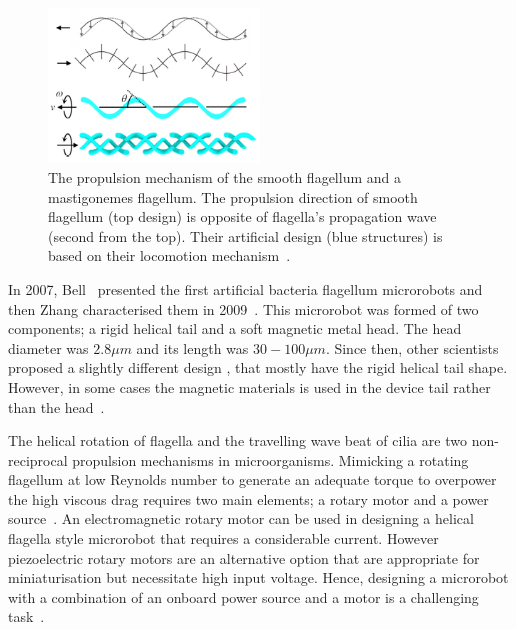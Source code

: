 \documentclass[12pt,a4paper,titlepage]{report}
\begin{document}
 
\paragraph{}

\begin{figure}
  \begin{center}
    \includegraphics[width=0.5\textwidth]{10}
  \caption[Propulsion mechanism of mastigonemes flagellum]{ The propulsion mechanism of the smooth flagellum and a mastigonemes flagellum.
The propulsion direction of smooth flagellum (top design) is opposite of flagella\rq{}s propagation 
wave (second from the top). Their artificial design (blue structures) is based on 
their locomotion mechanism~\citep{gao2013bioinspired}.}
  \label{10}
\end{center}
\end{figure}

In 2007, Bell~\citep{gao2013bioinspired} presented the first artificial bacteria flagellum microrobots and then
 Zhang characterised them in 2009~\citep{gao2013bioinspired}. This microrobot was formed of two 
components; a rigid helical tail and a soft magnetic metal head. The head diameter 
was $2.8 \mu  m$ and its length was $30-100 \mu m$. Since then, other scientists proposed a slightly different design 
, that mostly have the rigid helical tail shape. However, in some cases the magnetic
 materials is used in the device tail rather than the head~\citep{gao2013bioinspired}. 


The helical rotation of flagella and the travelling wave beat of cilia are two non-reciprocal propulsion
 mechanisms in microorganisms. Mimicking a rotating flagellum at low Reynolds number to generate an 
adequate torque to overpower the high viscous drag requires two main elements; a rotary motor and a
 power source~\citep{qiunanohelices}. 
An electromagnetic rotary motor can be used in designing a helical flagella style microrobot that 
requires a considerable current. However piezoelectric rotary motors are an alternative option 
that are appropriate for miniaturisation but necessitate high input voltage.  Hence, designing a microrobot with a 
combination of an onboard power source and a motor is a challenging task~\citep{qiunanohelices}.
\end{document}
